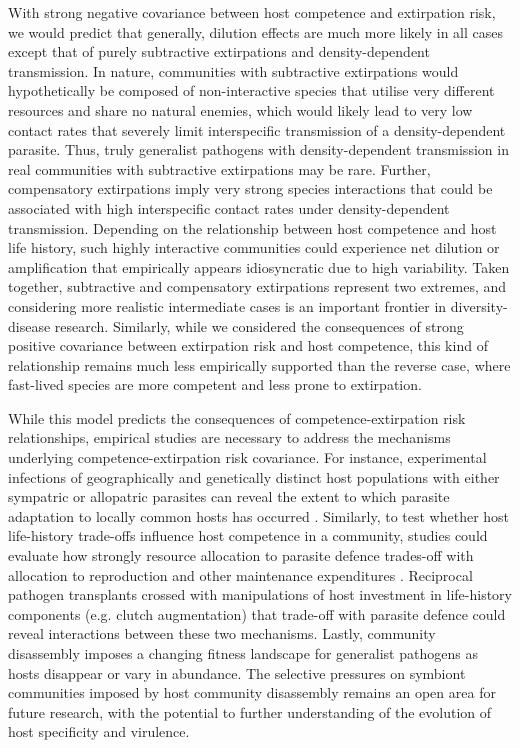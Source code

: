 With strong negative covariance between host competence and extirpation risk, we would predict that generally, dilution effects are much more likely in all cases except that of purely subtractive extirpations and density-dependent transmission.
In nature, communities with subtractive extirpations would hypothetically be composed of non-interactive species that utilise very different resources and share no natural enemies, which would likely lead to very low contact rates that severely limit interspecific transmission of a density-dependent parasite.
Thus, truly generalist pathogens with density-dependent transmission in real communities with subtractive extirpations may be rare.
Further, compensatory extirpations imply very strong species interactions that could be associated with high interspecific contact rates under density-dependent transmission.
Depending on the relationship between host competence and host life history, such highly interactive communities could experience net dilution or amplification that empirically appears idiosyncratic due to high variability.
Taken together, subtractive and compensatory extirpations represent two extremes, and considering more realistic intermediate cases is an important frontier in diversity-disease research.
Similarly, while we considered the consequences of strong positive covariance between extirpation risk and host competence, this kind of relationship remains much less empirically supported than the reverse case, where fast-lived species are more competent and less prone to extirpation.

While this model predicts the consequences of competence-extirpation risk relationships, empirical studies are necessary to address the mechanisms underlying competence-extirpation risk covariance.
For instance, experimental infections of geographically and genetically distinct host populations with either sympatric or allopatric parasites can reveal the extent to which parasite adaptation to locally common hosts has occurred \citep{Lively2000}.
Similarly, to test whether host life-history trade-offs influence host competence in a community, studies could evaluate how strongly resource allocation to parasite defence trades-off with allocation to reproduction and other maintenance expenditures \citep{Martin2006}.
Reciprocal pathogen transplants crossed with manipulations of host investment in life-history components (e.g. clutch augmentation) that trade-off with parasite defence could reveal interactions between these two mechanisms.
Lastly, community disassembly imposes a changing fitness landscape for generalist pathogens as hosts disappear or vary in abundance.
The selective pressures on symbiont communities imposed by host community disassembly remains an open area for future research, with the potential to further understanding of the evolution of host specificity and virulence.

